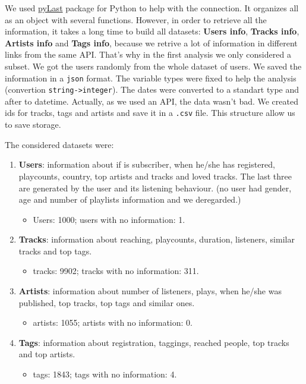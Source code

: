 \documentclass{article}
\begin{document}
We used \href{https://github.com/pylast/pylast}{pyLast}
package for Python to help with the connection. It organizes all as an object
with several functions. However, in order to retrieve all the information, it
takes a long time to build all datasets: \textbf{Users info}, \textbf{Tracks
info}, \textbf{Artists info} and \textbf{Tags info}, because we retrive a lot
of information in different links from the same API. That's why in the first
analysis we only considered a subset. We got the users randomly from the whole
dataset of users. We saved the information in a \lstinline{json} format. The
variable types were fixed to help the analysis (convertion
\lstinline{string->integer}). The dates were converted to a standart type and
after to datetime. Actually, as we used an API, the data wasn't bad. We
created ids for tracks, tags and artists and save it in a \lstinline{.csv}
file. This structure allow us to save storage. 

The considered datasets were: 

\begin{enumerate}
  \item \textbf{Users}: information about if is subscriber, when he/she 
  has registered, playcounts, country, top artists and tracks and loved
  tracks. The last three are generated by the user and its listening behaviour. (no user had gender, age and number of playlists information and
  we deregarded.) 
  \begin{itemize}
    \item Users: 1000; users with no information: 1.
  \end{itemize}
  \item \textbf{Tracks}: information about reaching, playcounts, duration,
  listeners, similar tracks and top tags.
  \begin{itemize}
    \item tracks: 9902; tracks with no information: 311.
  \end{itemize} 
  \item \textbf{Artists}: information about number of listeners, plays, when
  he/she was published, top tracks, top tags and similar ones.
  \begin{itemize}
    \item artists: 1055; artists with no information: 0.
  \end{itemize}
  \item \textbf{Tags}: information about registration, taggings, reached
  people, top tracks and top artists.
  \begin{itemize}
    \item tags: 1843; tags with no information: 4.
  \end{itemize} 
\end{enumerate}
\end{document}
